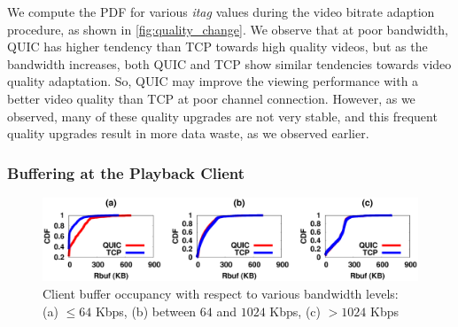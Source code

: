 We compute the \ac{PDF} for various \textit{itag} values during the video bitrate adaption procedure, as shown in \fig\ref{fig:quality_change}. 
We observe that at poor bandwidth, \ac{QUIC} has higher tendency than \ac{TCP} towards high quality videos, but as the bandwidth increases, both \ac{QUIC} and \ac{TCP} show similar tendencies towards video quality adaptation. So, \ac{QUIC} may improve the viewing performance with a better video quality than \ac{TCP}  at poor channel connection. However, as we observed, many of these quality upgrades are not very stable, and this frequent quality upgrades result in more data waste, as we observed earlier. 

\subsubsection{Buffering at the Playback Client}

\begin{figure}[!t]
	\captionsetup[subfigure]{}
	\begin{center}
        \includegraphics[width=\linewidth]{img/plotdata/CDF/Rbuf/plot_rbuf_bucket123}
		\caption{\label{fig:rbuf}Client buffer occupancy with respect to various bandwidth levels: (a) $\leq 64$ Kbps, (b)  between $64$ and $1024$ Kbps, (c) $> 1024$ Kbps}
	\end{center}
\end{figure}


